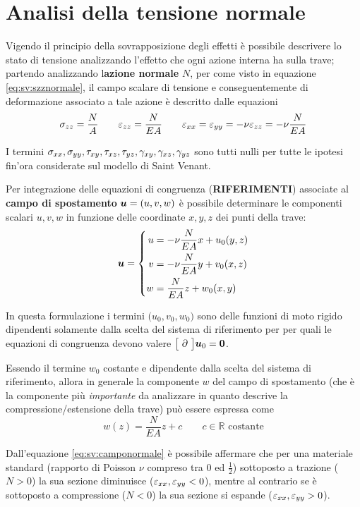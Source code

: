 \section{Analisi della tensione normale}
	Vigendo il principio della sovrapposizione degli effetti è possibile descrivere lo stato di tensione analizzando l'effetto che ogni azione interna ha sulla trave; partendo analizzando l\textbf{azione normale} $N$, per come visto in equazione \ref{eq:sv:szznormale}, il campo scalare di tensione e conseguentemente di deformazione associato a tale azione è descritto dalle equazioni
	\[ \sigma_{zz} = \frac NA  \qquad \varepsilon_{zz} = \frac N {EA} \qquad \varepsilon_{xx} = \varepsilon_{yy} = -\nu \varepsilon_{zz} = -\nu \frac N{EA} \]  
	\begin{osservazione}
		I termini $\sigma_{xx}, \sigma_{yy}, \tau_{xy},\tau_{xz},\tau_{yz}, \gamma_{xy},\gamma_{xz}, \gamma_{yz}$ sono tutti nulli per tutte le ipotesi fin'ora considerate sul modello di Saint Venant.
	\end{osservazione}
	\begin{concetto}		
		Per integrazione delle equazioni di congruenza (\textbf{RIFERIMENTI}) associate al \textbf{campo di spostamento} $\boldsymbol{u} = (u,v,w)$ è possibile determinare le componenti scalari $u,v,w$ in funzione delle coordinate $x,y,z$ dei punti della trave:
		\begin{equation}\label{eq:sv:camponormale}
			\boldsymbol{u} = \left\{ \begin{split}
				u &= -\nu \frac N {EA} x + u_0(y,z) \\
				v &= -\nu \frac N {EA} y + v_0(x,z) \\
				w &= \frac N {EA} z + w_0(x,y) \\
			\end{split} \right.
		\end{equation}
	\end{concetto}
	In questa formulazione i termini $\big(u_0,v_0,w_0\big)$ sono delle funzioni di moto rigido dipendenti solamente dalla scelta del sistema di riferimento per per quali le equazioni di congruenza devono valere $\big[ \ \partial \ \big] \boldsymbol{u}_0 = \boldsymbol{0}$.
	\begin{osservazione}
		Essendo il termine $w_0$ costante e dipendente dalla scelta del sistema di riferimento, allora in generale la componente $w$ del campo di spostamento (che è la componente più \textit{importante} da analizzare in quanto descrive la compressione/estensione della trave) può essere espressa come
		\[ w(z) = \frac N{EA}z + c \qquad c \in \mathds R \textrm{ costante}\]
	\end{osservazione}
	\begin{osservazione}
		Dall'equazione \ref{eq:sv:camponormale} è possibile affermare che per una materiale standard (rapporto di Poisson $\nu$ compreso tra $0$ ed $\frac 1 2$) sottoposto a trazione ($N> 0$) la sua sezione diminuisce ($\varepsilon_{xx}, \varepsilon_{yy} < 0$), mentre al contrario se è sottoposto a compressione ($N<0$) la sua sezione si espande ($\varepsilon_{xx},\varepsilon_{yy} > 0$). 
	\end{osservazione}
